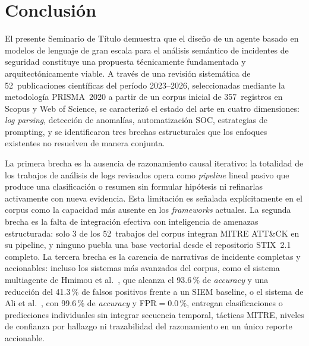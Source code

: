 \chapter{Conclusión}

El presente Seminario de Título demuestra que el diseño de un agente basado en modelos de lenguaje de gran escala para el análisis semántico de incidentes de seguridad constituye una propuesta técnicamente fundamentada y arquitectónicamente viable. A través de una revisión sistemática de 52~publicaciones científicas del período 2023--2026, seleccionadas mediante la metodología PRISMA~2020 a partir de un corpus inicial de 357~registros en Scopus y Web of Science, se caracterizó el estado del arte en cuatro dimensiones: \textit{log parsing}, detección de anomalías, automatización SOC, estrategias de prompting, y se identificaron tres brechas estructurales que los enfoques existentes no resuelven de manera conjunta.

La primera brecha es la ausencia de razonamiento causal iterativo: la totalidad de los trabajos de análisis de logs revisados opera como \textit{pipeline} lineal pasivo que produce una clasificación o resumen sin formular hipótesis ni refinarlas activamente con nueva evidencia. Esta limitación es señalada explícitamente en el corpus como la capacidad más ausente en los \textit{frameworks} actuales. La segunda brecha es la falta de integración efectiva con inteligencia de amenazas estructurada: solo 3 de los 52~trabajos del corpus integran MITRE ATT\&CK en su pipeline, y ninguno puebla una base vectorial desde el repositorio STIX~2.1 completo. La tercera brecha es la carencia de narrativas de incidente completas y accionables: incluso los sistemas más avanzados del corpus, como el sistema multiagente de Hmimou et al.~\cite{hmimou2025multiagent}, que alcanza el 93.6\,\% de \textit{accuracy} y una reducción del 41.3\,\% de falsos positivos frente a un SIEM baseline, o el sistema de Ali et al.~\cite{ali2025apt}, con 99.6\,\% de \textit{accuracy} y FPR$=0.0\,\%$, entregan clasificaciones o predicciones individuales sin integrar secuencia temporal, tácticas MITRE, niveles de confianza por hallazgo ni trazabilidad del razonamiento en un único reporte accionable.

